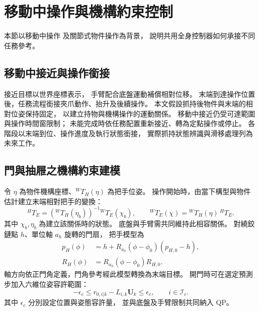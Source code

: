 \section{移動中操作與機構約束控制}
\label{sec:mobile_constrained_operation}

本節以移動中操作\cite{burgess2023motm}
及關節式物件操作\cite{mittal2022articulated}為背景，
說明共用全身控制器如何承接不同任務參考。

\subsection{移動中接近與操作銜接}
\label{subsec:moving_approach_grasp}

接近目標以世界座標表示，
手臂配合底盤運動補償相對位移。
末端到達操作位置後，任務流程銜接夾爪動作、抬升及後續操作。
本文假設抓持後物件與末端的相對位姿保持固定，
以建立持物與機構操作的運動關係。
移動中接近仍受可達範圍與操作時間窗限制；
未能完成時依任務配置重新接近、轉為定點操作或停止。
各階段以末端到位、操作進度及執行狀態銜接，
實際抓持狀態辨識與滑移處理列為未來工作。

\subsection{門與抽屜之機構約束建模}
\label{subsec:articulated_object_constraints}

令 $\eta$ 為物件機構座標、$ {}^WT_H(\eta)$ 為把手位姿。
操作開始時，由當下構型與物件估計建立末端相對把手的變換：
\begin{equation}
    {}^HT_E=({}^WT_H(\eta_b))^{-1}{}^WT_E(\chi_b),
    \qquad
    {}^WT_E(\chi)={}^WT_H(\eta)\,{}^HT_E .
    \label{eq:ch3_grasp_closed_chain}
\end{equation}
其中 $\chi_b,\eta_b$ 為建立該關係時的狀態。
底盤與手臂需共同維持此相容關係。
對繞鉸鏈點 $h$、單位軸 $a_h$ 旋轉的門扇，
把手模型為
\begin{equation}
    \begin{aligned}
        p_H(\phi)&=h+R_{a_h}(\phi-\phi_0)(p_{H,0}-h),\\
        R_H(\phi)&=R_{a_h}(\phi-\phi_0)R_{H,0}.
    \end{aligned}
    \label{eq:ch3_revolute_handle_model}
\end{equation}
軸方向依正門角定義，門角參考經此模型轉換為末端目標。
開門時可在選定預測步加入六維位姿容許範圍：
\begin{equation}
    -\epsilon_c\leq r_{0,i|k}-L_{i,k}\mathbf U_k\leq\epsilon_c,
    \qquad i\in\mathcal I_c .
    \label{eq:ch3_contact_pose_tube}
\end{equation}
其中 $\epsilon_c$ 分別設定位置與姿態容許量，
並與底盤及手臂限制共同納入 QP。

